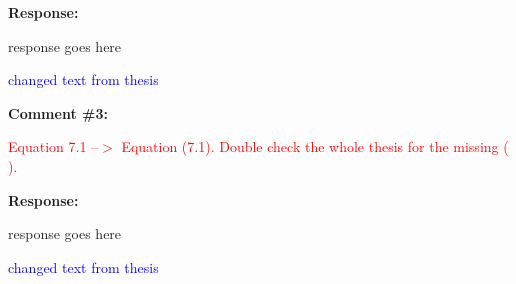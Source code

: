 \documentclass[journal]{IEEEtran}
\begin{document}
\vspace{10pt}
\textbf{Response:}
\begin{adjustwidth}{2.5em}{0pt}
response goes here

\vspace{10pt}
\noindent\textcolor{blue}{changed text from thesis}
\end{adjustwidth}


\vspace{30pt}
\textbf{Comment \#3:}
\begin{adjustwidth}{2.5em}{0pt}
\singlespacing \vspace{-10pt}
\textcolor{red}{Equation 7.1 --$>$ Equation (7.1). Double check the whole thesis for the missing ( ).}
\end{adjustwidth}

\vspace{10pt}
\textbf{Response:}
\begin{adjustwidth}{2.5em}{0pt}
response goes here

\vspace{10pt}
\noindent\textcolor{blue}{changed text from thesis}
\end{adjustwidth}
\end{document}
